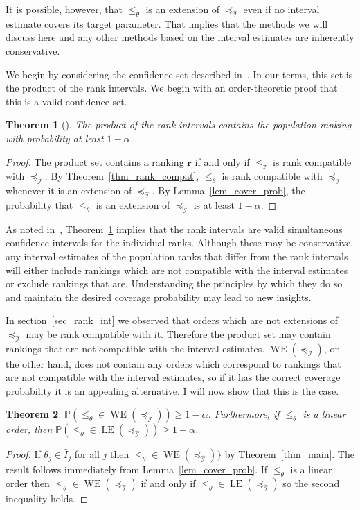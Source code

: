 \documentclass[12pt]{article}
\newcommand{\prob}[1]{\mathbb{P}(#1)}
\newcommand{\iord}{{\preceq_{\hat{\mathcal{I}}}}}
\newcommand{\pord}{{\leqslant_{\theta}}}
\newcommand{\rord}[1][\mathbf{r}]{{\leqslant_{#1}}}
\newcommand{\LE}[1]{\operatorname{LE}(#1)}
\newcommand{\WE}[1]{\operatorname{WE}(#1)}
\newtheorem{theorem}{Theorem}
\numberwithin{theorem}{section}
\begin{document}
\noindent
It is possible, however, that $\pord$ is an extension of $\iord$ even if no interval estimate covers its target parameter.  That implies that the methods we will discuss here and any other methods based on the interval estimates are inherently conservative.

We begin by considering the confidence set described in~\cite{klein2020jointCR}.  In our terms, this set is the product of the rank intervals.  We begin with an order-theoretic proof that this is a valid confidence set.

\begin{theorem}[\cite{klein2020jointCR}]
\label{thm_product_set}
The product of the rank intervals contains the population ranking with probability at least $1 - \alpha$.
\end{theorem}
\begin{proof}
The product set contains a ranking $\mathbf{r}$ if and only if $\rord$ is rank compatible with $\iord$.  By Theorem~\ref{thm_rank_compat}, $\pord$ is rank compatible with $\iord$ whenever it is an extension of $\iord$.  By Lemma~\ref{lem_cover_prob}, the probability that $\pord$ is an extension of $\iord$ is at least $1 - \alpha$.
\end{proof}

\noindent
As noted in~\cite{klein2020jointCR}, Theorem~\ref{thm_product_set} implies that the rank intervals are valid simultaneous confidence intervals for the individual ranks.  Although these may be conservative, any interval estimates of the population ranks that differ from the rank intervals will either include rankings which are not compatible with the interval estimates or exclude rankings that are.  Understanding the principles by which they do so and maintain the desired coverage probability may lead to new insights.

In section~\ref{sec_rank_int} we observed that orders which are not extensions of $\iord$ may be rank compatible with it.  Therefore the product set may contain rankings that are not compatible with the interval estimates.  $\WE{\iord}$, on the other hand, does not contain any orders which correspond to rankings that are not compatible with the interval estimates, so if it has the correct coverage probability it is an appealing alternative.  I will now show that this is the case.

\begin{theorem}
\label{thm_conf_set_weak_ext}
$\prob{\pord \in \WE{\iord}} \geq 1 - \alpha$.  Furthermore, if $\pord$ is a linear order, then $\prob{\pord \in \LE{\iord}} \geq 1 - \alpha$.
\end{theorem}
\begin{proof}
If $\theta_j \in \hat{I}_j$ for all $j$ then $\pord \in \WE{\iord}\}$ by Theorem~\ref{thm_main}.  The result follows immediately from Lemma~\ref{lem_cover_prob}.  If $\pord$ is a linear order then $\pord \in \WE{\iord}$ if and only if $\pord \in \LE{\iord}$ so the second inequality holds.
\end{proof}
\end{document}
